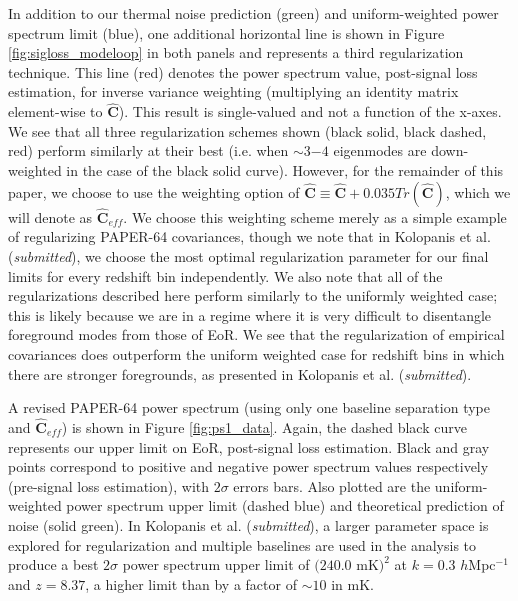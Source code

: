 \documentclass[preprint2,numberedappendix,tighten]{aastex6}  %
\begin{document}
In addition to our thermal noise prediction (green) and uniform-weighted power spectrum limit (blue), one additional horizontal line is shown in Figure \ref{fig:sigloss_modeloop} 
in both panels and represents a third regularization technique. This line (red) denotes the power spectrum value, post-signal loss estimation, for inverse variance weighting (multiplying an identity 
matrix element-wise to $\widehat{\textbf{C}}$). This result is single-valued and not a function of the x-axes. We see that all three regularization schemes shown (black solid, black dashed, red) perform similarly at 
their best (i.e. when $\sim3$$-4$ eigenmodes are down-weighted in the case of the black solid curve). However, for the remainder of this paper, we choose to use the weighting option of $\widehat{\textbf{C}} \equiv \widehat{\textbf{C}} + 0.035Tr(\widehat{\textbf{C}})$, which we will denote as $\widehat{\textbf{C}}_{eff}$. We choose this weighting scheme merely as a simple example of regularizing PAPER-64 covariances, though we note that in Kolopanis et al. (\textit{submitted}), we choose the most optimal regularization parameter for our final limits for every redshift bin independently. We also note that all of the regularizations described here perform similarly to the uniformly weighted case; this is likely because we are in a regime where it is very difficult to disentangle foreground modes from those of EoR. We see that the regularization of empirical covariances does outperform the uniform weighted case for redshift bins in which there are stronger foregrounds, as presented in Kolopanis et al. (\textit{submitted}).

A revised PAPER-64 power spectrum (using only one baseline separation type and $\widehat{\textbf{C}}_{eff}$) is shown in Figure 
\ref{fig:ps1_data}. Again, the dashed black curve represents our upper limit on EoR, post-signal loss estimation. Black and gray points correspond to positive and negative power spectrum values respectively (pre-signal loss estimation), with 
$2\sigma$ errors bars. Also plotted are the uniform-weighted power spectrum upper limit (dashed blue) and theoretical prediction of 
noise (solid green). In Kolopanis et al. (\textit{submitted}), a larger parameter space is explored for regularization and multiple baselines are used in the analysis to produce a best $2\sigma$ power spectrum upper limit of $(240.0$ mK$)^{2}$ at $k=0.3$ $h$Mpc$^{-1}$ and $z=8.37$, 
a higher limit than  by a factor of $\sim$$10$ in mK.
\end{document}
